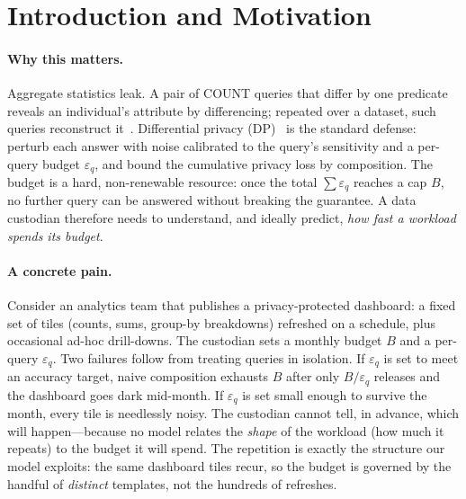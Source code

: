 \documentclass[sigconf,nonacm]{acmart}
\newcommand{\eps}{\varepsilon}
\begin{document}
\maketitle

\section{Introduction and Motivation}
\label{sec:intro}

\paragraph{Why this matters.}
Aggregate statistics leak. A pair of COUNT queries that differ by one predicate reveals an individual's attribute by differencing; repeated over a dataset, such queries reconstruct it~\cite{dinur2003revealing}. Differential privacy (DP)~\cite{dwork2006calibrating,dwork2014algorithmic} is the standard defense: perturb each answer with noise calibrated to the query's sensitivity and a per-query budget $\eps_q$, and bound the cumulative privacy loss by composition. The budget is a hard, non-renewable resource: once the total $\sum\eps_q$ reaches a cap $B$, no further query can be answered without breaking the guarantee. A data custodian therefore needs to understand, and ideally predict, \emph{how fast a workload spends its budget}.

\paragraph{A concrete pain.}
Consider an analytics team that publishes a privacy-protected dashboard: a fixed set of tiles (counts, sums, group-by breakdowns) refreshed on a schedule, plus occasional ad-hoc drill-downs. The custodian sets a monthly budget $B$ and a per-query $\eps_q$. Two failures follow from treating queries in isolation. If $\eps_q$ is set to meet an accuracy target, naive composition exhausts $B$ after only $B/\eps_q$ releases and the dashboard goes dark mid-month. If $\eps_q$ is set small enough to survive the month, every tile is needlessly noisy. The custodian cannot tell, in advance, which will happen---because no model relates the \emph{shape} of the workload (how much it repeats) to the budget it will spend. The repetition is exactly the structure our model exploits: the same dashboard tiles recur, so the budget is governed by the handful of \emph{distinct} templates, not the hundreds of refreshes.
\end{document}
